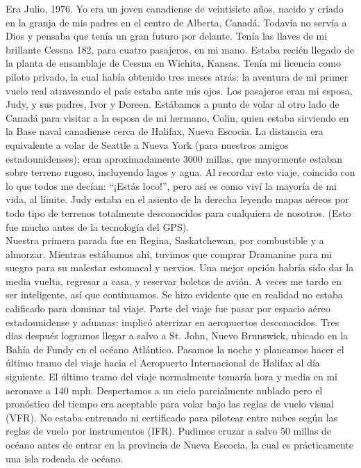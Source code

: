 \documentclass[twoside, 12pt]{book}
\begin{document}
Era Julio, 1976. Yo era un joven canadiense de veintisiete años, nacido y criado en la granja de mis padres en el centro de Alberta, Canadá. Todavía no servía a Dios y pensaba que tenía un gran futuro por delante. Tenía las llaves de mi brillante Cessna 182, para cuatro pasajeros, en mi mano. Estaba recién llegado de la planta de ensamblaje de Cessna en Wichita, Kansas. Tenía mi licencia como piloto privado, la cual había obtenido tres meses atrás: la aventura de mi primer vuelo real atravesando el país estaba ante mis ojos. Los pasajeros eran mi esposa, Judy, y sus padres, Ivor y Doreen. Estábamos a punto de volar al otro lado de Canadá para visitar a la esposa de mi hermano, Colin, quien estaba sirviendo en la Base naval canadiense cerca de Halifax, Nueva Escocia. La distancia era equivalente a volar de Seattle a Nueva York (para nuestros amigos estadounidenses); eran aproximadamente 3000 millas, que mayormente estaban sobre terreno rugoso, incluyendo lagos y agua. Al recordar este viaje, coincido con lo que todos me decían: “¡Estás loco!”, pero así es como viví la mayoría de mi vida, al límite. Judy estaba en el asiento de la derecha leyendo mapas aéreos por todo tipo de terrenos totalmente desconocidos para cualquiera de nosotros. (Esto fue mucho antes de la tecnología del GPS).\\

Nuestra primera parada fue en Regina, Saskatchewan, por combustible y a almorzar. Mientras estábamos ahí, tuvimos que comprar Dramanine para mi suegro para su malestar estomacal y nervios. Una mejor opción habría sido dar la media vuelta, regresar a casa, y reservar boletos de avión. A veces me tardo en ser inteligente, así que continuamos. Se hizo evidente que en realidad no estaba calificado para dominar tal viaje. Parte del viaje fue pasar por espacio aéreo estadounidense y aduanas; implicó aterrizar en aeropuertos desconocidos.
Tres días después logramos llegar a salvo a St. John, Nuevo Brunswick, ubicado en la Bahía de Fundy en el océano Atlántico. Pasamos la noche y planeamos hacer el último tramo del viaje hacia el Aeropuerto Internacional de Halifax al día siguiente. El último tramo del viaje normalmente tomaría hora y media en mi aeronave a 140 mph. Despertamos a un cielo parcialmente nublado pero el pronóstico del tiempo era aceptable para volar bajo las reglas de vuelo visual (VFR). No estaba entrenado ni certificado para pilotear entre nubes según las reglas de vuelo por instrumentos (IFR).  Pudimos cruzar a salvo 50 millas de océano antes de entrar en la provincia de Nueva Escocia, la cual es prácticamente una isla rodeada de océano.\\
\end{document}
